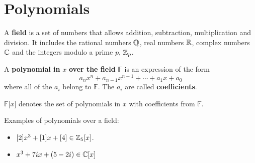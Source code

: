 \documentclass[english, 12pt]{article}
\begin{document}
\section{Polynomials}
\begin{defn}
A \textbf{field} is a set of numbers that allows addition, subtraction, multiplication and division. It includes the rational numbers ${\mathbb{Q}}$, real numbers ${\mathbb{R}}$, complex numbers ${\mathbb{C}}$ and the integers modulo a prime $p$, ${\mathbb{Z}}_{p}$.
\end{defn}
\begin{defn}
A \textbf{polynomial in} $x$ \textbf{over the field}  $\mathbb{F}$ is an expression of the form
\[a_{n}x^n + a_{n-1}x^{n-1} + \cdots + a_{1} x + a_{0}\]
where all of the $a_{i}$ belong to $\mathbb{F}$. The $a_{i}$ are called \textbf{coefficients}.
\end{defn}
\begin{exmp}
$\mathbb{F}\lbrack x \rbrack$ denotes the set of polynomials in $x$ with coefficients from $\mathbb{F}$.
\end{exmp}
\begin{exmp}
Examples of polynomials over a field:
\begin{itemize}
\item $\lbrack 2 \rbrack x^3+ \lbrack 1 \rbrack x + \lbrack 4 \rbrack \in {\mathbb{Z}}_{5}\lbrack x \rbrack$.
\item $x^3 + 7ix + (5-2i) \in {\mathbb{C}} \lbrack x \rbrack$
\end{itemize}
\end{exmp}
\end{document}
